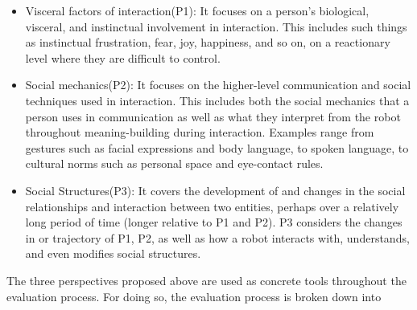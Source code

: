 \begin{itemize}
\item Visceral factors of interaction(P1): It focuses on a person’s biological, visceral, and instinctual involvement
in interaction. This includes such things as instinctual frustration, fear, joy, happiness, and so on, on a reactionary level where they are difficult to control.

\item Social mechanics(P2): It focuses on the higher-level communication and social techniques used in interaction. This includes both the social mechanics that a person uses in communication as well as what they interpret from the robot throughout meaning-building during interaction. Examples range from gestures such as facial expressions and body language, to spoken language, to cultural norms such as personal space and eye-contact rules.

\item Social Structures(P3): It covers the development of and changes in the social relationships and interaction between two entities, perhaps over a relatively long period of time (longer relative to P1 and P2). P3 considers the changes in or trajectory of P1, P2, as well as how a robot interacts with, understands, and even modifies social structures.

\end{itemize}

The three perspectives proposed above are used as concrete tools throughout the evaluation process. For doing so, the evaluation process is broken down into 

